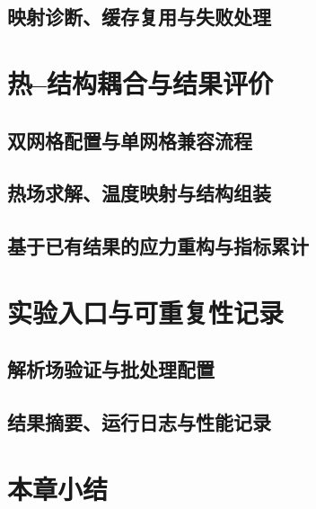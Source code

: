 \subsection{映射诊断、缓存复用与失败处理}
\thesisdraftnote

\section{热--结构耦合与结果评价}
\subsection{双网格配置与单网格兼容流程}
\thesisdraftnote

\subsection{热场求解、温度映射与结构组装}
\thesisdraftnote

\subsection{基于已有结果的应力重构与指标累计}
\thesisdraftnote

\section{实验入口与可重复性记录}
\subsection{解析场验证与批处理配置}
\thesisdraftnote

\subsection{结果摘要、运行日志与性能记录}
\thesisdraftnote

\section{本章小结}
\thesisdraftnote


